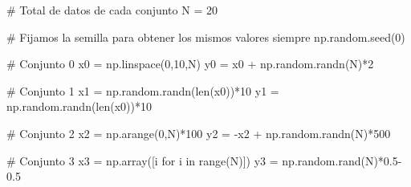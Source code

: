 \documentclass[
  letterpaper,
  DIV=11,
  numbers=noendperiod]{scrreprt}
\newenvironment{Shaded}{\begin{snugshade}}{\end{snugshade}}
\newcommand{\BuiltInTok}[1]{\textcolor[rgb]{0.00,0.23,0.31}{#1}}
\newcommand{\CommentTok}[1]{\textcolor[rgb]{0.37,0.37,0.37}{#1}}
\newcommand{\ControlFlowTok}[1]{\textcolor[rgb]{0.00,0.23,0.31}{#1}}
\newcommand{\DecValTok}[1]{\textcolor[rgb]{0.68,0.00,0.00}{#1}}
\newcommand{\FloatTok}[1]{\textcolor[rgb]{0.68,0.00,0.00}{#1}}
\newcommand{\KeywordTok}[1]{\textcolor[rgb]{0.00,0.23,0.31}{#1}}
\newcommand{\NormalTok}[1]{\textcolor[rgb]{0.00,0.23,0.31}{#1}}
\newcommand{\OperatorTok}[1]{\textcolor[rgb]{0.37,0.37,0.37}{#1}}
\begin{document}
\begin{Shaded}
\begin{Highlighting}[]
\CommentTok{\# Total de datos de cada conjunto}
\NormalTok{N }\OperatorTok{=} \DecValTok{20}

\CommentTok{\# Fijamos la semilla para obtener los mismos valores siempre}
\NormalTok{np.random.seed(}\DecValTok{0}\NormalTok{)}

\CommentTok{\# Conjunto 0}
\NormalTok{x0 }\OperatorTok{=}\NormalTok{ np.linspace(}\DecValTok{0}\NormalTok{,}\DecValTok{10}\NormalTok{,N) }
\NormalTok{y0 }\OperatorTok{=}\NormalTok{ x0 }\OperatorTok{+}\NormalTok{ np.random.randn(N)}\OperatorTok{*}\DecValTok{2}

\CommentTok{\# Conjunto 1}
\NormalTok{x1 }\OperatorTok{=}\NormalTok{ np.random.randn(}\BuiltInTok{len}\NormalTok{(x0))}\OperatorTok{*}\DecValTok{10}
\NormalTok{y1 }\OperatorTok{=}\NormalTok{ np.random.randn(}\BuiltInTok{len}\NormalTok{(x0))}\OperatorTok{*}\DecValTok{10}

\CommentTok{\# Conjunto 2}
\NormalTok{x2 }\OperatorTok{=}\NormalTok{ np.arange(}\DecValTok{0}\NormalTok{,N)}\OperatorTok{*}\DecValTok{100}
\NormalTok{y2 }\OperatorTok{=} \OperatorTok{{-}}\NormalTok{x2 }\OperatorTok{+}\NormalTok{ np.random.randn(N)}\OperatorTok{*}\DecValTok{500}

\CommentTok{\# Conjunto 3}
\NormalTok{x3 }\OperatorTok{=}\NormalTok{ np.array([i }\ControlFlowTok{for}\NormalTok{ i }\KeywordTok{in} \BuiltInTok{range}\NormalTok{(N)])}
\NormalTok{y3 }\OperatorTok{=}\NormalTok{ np.random.rand(N)}\OperatorTok{*}\FloatTok{0.5}\OperatorTok{{-}}\FloatTok{0.5}
\end{Highlighting}
\end{Shaded}
\end{document}
